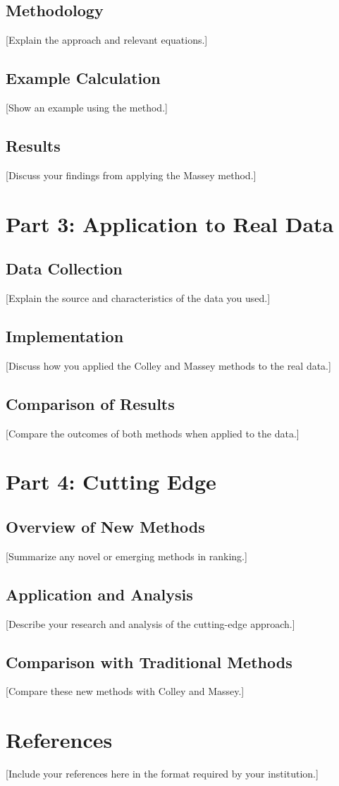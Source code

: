 \documentclass[12pt]{article}
\begin{document}
\subsection{Methodology}
[Explain the approach and relevant equations.]

\subsection{Example Calculation}
[Show an example using the method.]

\subsection{Results}
[Discuss your findings from applying the Massey method.]

\section{Part 3: Application to Real Data}
\subsection{Data Collection}
[Explain the source and characteristics of the data you used.]

\subsection{Implementation}
[Discuss how you applied the Colley and Massey methods to the real data.]

\subsection{Comparison of Results}
[Compare the outcomes of both methods when applied to the data.]

\section{Part 4: Cutting Edge}
\subsection{Overview of New Methods}
[Summarize any novel or emerging methods in ranking.]

\subsection{Application and Analysis}
[Describe your research and analysis of the cutting-edge approach.]

\subsection{Comparison with Traditional Methods}
[Compare these new methods with Colley and Massey.]

\newpage
\section*{References}
[Include your references here in the format required by your institution.]
\end{document}
